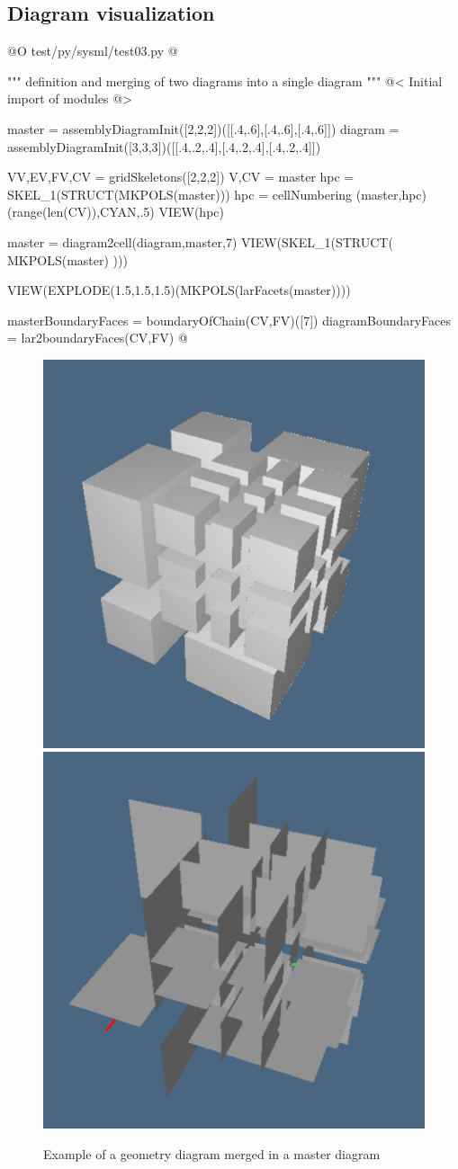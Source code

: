 \documentclass[11pt,oneside]{article}	%
\begin{document}
\subsection{Diagram visualization}


@O test/py/sysml/test03.py
@{""" definition and merging of two diagrams into a single diagram """
@< Initial import of modules @>

master = assemblyDiagramInit([2,2,2])([[.4,.6],[.4,.6],[.4,.6]])
diagram = assemblyDiagramInit([3,3,3])([[.4,.2,.4],[.4,.2,.4],[.4,.2,.4]])

VV,EV,FV,CV = gridSkeletons([2,2,2])
V,CV = master
hpc = SKEL_1(STRUCT(MKPOLS(master)))
hpc = cellNumbering (master,hpc)(range(len(CV)),CYAN,.5)
VIEW(hpc)

master = diagram2cell(diagram,master,7)
VIEW(SKEL_1(STRUCT( MKPOLS(master) )))

VIEW(EXPLODE(1.5,1.5,1.5)(MKPOLS(larFacets(master))))

masterBoundaryFaces = boundaryOfChain(CV,FV)([7])
diagramBoundaryFaces = lar2boundaryFaces(CV,FV)
@}

\begin{figure}[htbp] %
   \centering
   \includegraphics[height=0.49\linewidth,width=0.49\linewidth]{images/mastermerged} 
   \includegraphics[height=0.49\linewidth,width=0.49\linewidth]{images/masterfacets} 
   \caption{Example of a geometry diagram merged in a master diagram}
   \label{fig:mastermerged}
\end{figure}
\end{document}
